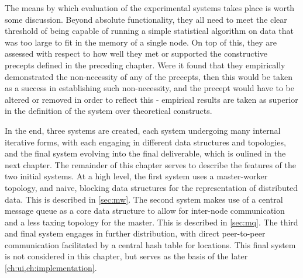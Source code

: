 The means by which evaluation of the experimental systems takes place is worth some discussion.
Beyond absolute functionality, they all need to meet the clear threshold of being capable of running a simple statistical algorithm on data that was too large to fit in the memory of a single node.
On top of this, they are assessed with respect to how well they met or supported the constructive precepts defined in the preceding chapter.
Were it found that they empirically demonstrated the non-necessity of any of the precepts, then this would be taken as a success in establishing such non-necessity, and the precept would have to be altered or removed in order to reflect this - empirical results are taken as superior in the definition of the system over theoretical constructs.

In the end, three systems are created, each system undergoing many internal iterative forms, with each engaging in different data structures and topologies, and the final system evolving into the final deliverable, which is oulined in the next chapter.
The remainder of this chapter serves to describe the features of the two initial systems.
At a high level, the first system uses a master-worker topology, and naive, blocking data structures for the representation of distributed data.
This is described in \cref{sec:mw}.
The second system makes use of a central message queue as a core data structure to allow for inter-node communication and a less taxing topology for the master.
This is described in \cref{sec:mq}.
The third and final system engages in further distribution, with direct peer-to-peer communication facilitated by a central hash table for locations.
This final system is not considered in this chapter, but serves as the basis of the later \cref{ch:ui,ch:implementation}.

